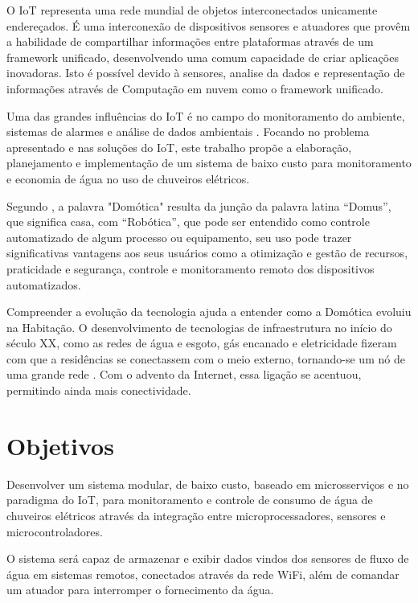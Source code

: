 O IoT representa uma rede mundial de objetos interconectados unicamente endereçados. É uma interconexão de dispositivos sensores e atuadores que provêm a habilidade de compartilhar informações entre plataformas através de um framework unificado, desenvolvendo uma comum capacidade de criar aplicações inovadoras. Isto é possível devido à sensores, analise da dados e representação de informações através de Computação em nuvem como o framework unificado. \cite{RisteskaStojkoska2017}

Uma das grandes influências do IoT é no campo do monitoramento do ambiente, sistemas de alarmes e análise de dados ambientais \cite{Perumal2016}. Focando no problema apresentado e nas soluções do IoT, este trabalho propõe a elaboração, planejamento e implementação de um sistema de baixo custo para monitoramento e economia de água no uso de chuveiros elétricos.

Segundo \cite{VarelaDeSouza}, a palavra "Domótica" resulta da junção da palavra latina
“Domus”, que significa casa, com “Robótica”, que pode ser entendido como controle automatizado de algum processo ou equipamento, seu uso pode trazer significativas vantagens aos seus usuários como a otimização e gestão de recursos, praticidade e segurança, controle e monitoramento remoto dos dispositivos automatizados.

Compreender a evolução da tecnologia ajuda a entender como a
Domótica evoluiu na Habitação. O desenvolvimento de tecnologias de infraestrutura no início do século XX, como as redes de água e esgoto, gás encanado e eletricidade fizeram com que a residências se conectassem com o meio externo, tornando-se um nó de uma grande rede \cite{forty2007objetos}. Com o advento da Internet, essa ligação se acentuou, permitindo ainda mais conectividade. \cite{VarelaDeSouza} 



\section{Objetivos}

Desenvolver um sistema modular, de baixo custo, baseado em microsserviços e no paradigma do IoT, para monitoramento e controle de consumo de água de chuveiros elétricos através da integração entre microprocessadores, sensores e microcontroladores. 

O sistema será capaz de armazenar e exibir dados vindos dos sensores de fluxo de água em sistemas remotos, conectados através da rede WiFi, além de comandar um atuador para interromper o fornecimento da água.

